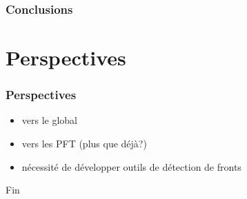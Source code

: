\documentclass[11pt, french, aspectratio=32]{beamer}
\begin{document}
\begin{frame}
  \frametitle{Conclusions}

\end{frame}


\section{Perspectives}
\begin{frame}
  \frametitle{Perspectives}

  \begin{itemize}
    \item vers le global
    \item vers les PFT (plus que déjà?)
    \item nécessité de développer outils de détection de fronts
  \end{itemize}

\end{frame}


\begin{frame}
  Fin
\end{frame}

\appendix
\end{document}
